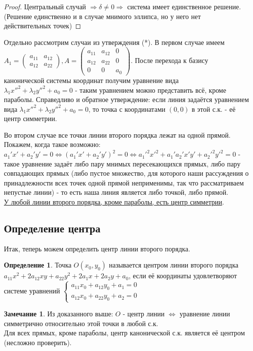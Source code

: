 \documentclass[a4paper, 12pt]{article}
\theoremstyle{definition}
\newtheorem*{definition}{Определение}
\newtheorem*{remark}{Замечание}
\begin{document}
	\begin{proof}
		Центральный случай $\Rightarrow \delta \neq 0 \Rightarrow$ система имеет единственное решение.\\
		(Решение единственно и в случае мнимого эллипса, но у него нет действительных точек) 
	\end{proof}
	Отдельно рассмотрим случаи из утверждения (*). В первом случае имеем $A_1 = \begin{pmatrix}a_{11}&a_{12}\\a_{12}&a_{22}\end{pmatrix}, A = \begin{pmatrix}a_{11}&a_{12}&0\\a_{12}&a_{22}&0\\ 0&0&a_{0}\end{pmatrix}$. После перехода к базису канонической системы координат получим уравнение вида $\lambda_1{x''}^2 + \lambda_2{y''}^2 + a_0 = 0$ - таким уравнением можно представить всё, кроме параболы. Справедливо и обратное утверждение: если линия задаётся уравнением вида $\lambda_1{x''}^2 + \lambda_2{y''}^2 + a_0 = 0$, то точка с координатами $(0, 0)$ в этой с.к. - её центр симметрии.

	Во втором случае все точки линии второго порядка лежат на одной прямой. Покажем, когда такое возможно: $a_1'x' + a_2'y' = 0 \Leftrightarrow (a_1'x' + a_2'y')^2 = 0 \Leftrightarrow {a_1'}^2{x'}^2 + a_1'a_2'x'y' + {a_2'}^2{y'}^2 = 0$ - такое уравнение задаёт либо пару мнимых пересекающихся прямых, либо пару совпадающих прямых (либо пустое множество, для которого наши рассуждения о принадлежности всех точек одной прямой неприменимы, так что рассматриваем непустые линии) - то есть наша линия является либо точкой, либо прямой.\\
	\underline{У любой линии второго порядка, кроме параболы, есть центр симметрии}.

	\subsection{Определение центра}
	Итак, теперь можем определить центр линии второго порядка.
	\begin{definition}
		Точка $O(x_0, y_0)$ называется центром линии второго порядка $a_{11}x^2 + 2a_{12}xy + a_{22}y^2 + 2a_{1}x + 2a_{2}y + a_{0}$, если её координаты удовлетворяют системе уравнений $\begin{cases}
			a_{11}x_0+a_{12}y_0+a_1=0\\
			a_{12}x_0+a_{22}y_0+a_2=0
		\end{cases}$
	\end{definition}
	\begin{remark}
		Из доказанного выше: $O$ - центр линии $\Leftrightarrow$ уравнение линии симметрично относительно этой точки в любой с.к.\\
		Для всех прямых, кроме параболы, центр канонической с.к. является её центром (несложно проверить).
	\end{remark}
\end{document}
